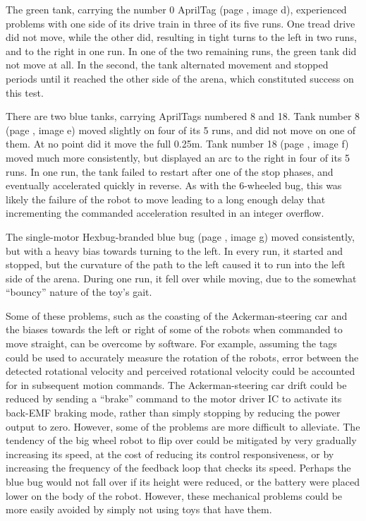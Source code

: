 The green tank, carrying the number 0 AprilTag (page \pageref{img_traj}, image d), experienced problems with one side of its drive train in three of its five runs.
One tread drive did not move, while the other did, resulting in tight turns to the left in two runs, and to the right in one run. In one of the two remaining runs, the green tank did not move at all. In the second, the tank alternated movement and stopped periods until it reached the other side of the arena, which constituted success on this test. 

There are two blue tanks, carrying AprilTags numbered 8 and 18. 
Tank number 8 (page \pageref{img_traj}, image e) moved slightly on four of its 5 runs, and did not move on one of them. 
At no point did it move the full 0.25m. 
Tank number 18 (page \pageref{img_traj}, image f) moved much more consistently, but displayed an arc to the right in four of its 5 runs. 
In one run, the tank failed to restart after one of the stop phases, and eventually accelerated quickly in reverse. 
As with the 6-wheeled bug, this was likely the failure of the robot to move leading to a long enough delay that incrementing the commanded acceleration resulted in an integer overflow. 

The single-motor Hexbug-branded blue bug (page \pageref{img_traj}, image g) moved consistently, but with a heavy bias towards turning to the left. 
In every run, it started and stopped, but the curvature of the path to the left caused it to run into the left side of the arena. 
During one run, it fell over while moving, due to the somewhat ``bouncy'' nature of the toy's gait.

Some of these problems, such as the coasting of the Ackerman-steering car and the biases towards the left or right of some of the robots when commanded to move straight, can be overcome by software. 
For example, assuming the tags could be used to accurately measure the rotation of the robots, error between the detected rotational velocity and perceived rotational velocity could be accounted for in subsequent motion commands. 
The Ackerman-steering car drift could be reduced by sending a ``brake'' command to the motor driver IC to activate its back-EMF braking mode, rather than simply stopping by reducing the power output to zero. 
However, some of the problems are more difficult to alleviate. 
The tendency of the big wheel robot to flip over could be mitigated by very gradually increasing its speed, at the cost of reducing its control responsiveness, or by increasing the frequency of the feedback loop that checks its speed. 
Perhaps the blue bug would not fall over if its height were reduced, or the battery were placed lower on the body of the robot.
However, these mechanical problems could be more easily avoided by simply not using toys that have them. 


